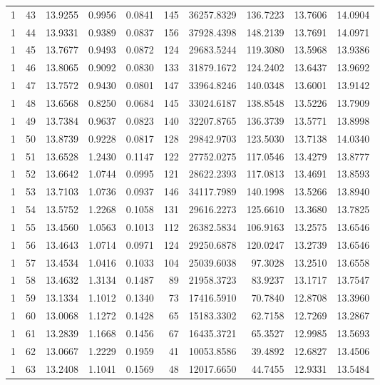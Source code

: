 \begin{longtable}{rrrrrrrrrr}
1 & 43 & 13.9255 & 0.9956 & 0.0841 & 145 & 36257.8329 & 136.7223 & 13.7606 & 14.0904 \\
1 & 44 & 13.9331 & 0.9389 & 0.0837 & 156 & 37928.4398 & 148.2139 & 13.7691 & 14.0971 \\
1 & 45 & 13.7677 & 0.9493 & 0.0872 & 124 & 29683.5244 & 119.3080 & 13.5968 & 13.9386 \\
1 & 46 & 13.8065 & 0.9092 & 0.0830 & 133 & 31879.1672 & 124.2402 & 13.6437 & 13.9692 \\
1 & 47 & 13.7572 & 0.9430 & 0.0801 & 147 & 33964.8246 & 140.0348 & 13.6001 & 13.9142 \\
1 & 48 & 13.6568 & 0.8250 & 0.0684 & 145 & 33024.6187 & 138.8548 & 13.5226 & 13.7909 \\
1 & 49 & 13.7384 & 0.9637 & 0.0823 & 140 & 32207.8765 & 136.3739 & 13.5771 & 13.8998 \\
1 & 50 & 13.8739 & 0.9228 & 0.0817 & 128 & 29842.9703 & 123.5030 & 13.7138 & 14.0340 \\
1 & 51 & 13.6528 & 1.2430 & 0.1147 & 122 & 27752.0275 & 117.0546 & 13.4279 & 13.8777 \\
1 & 52 & 13.6642 & 1.0744 & 0.0995 & 121 & 28622.2393 & 117.0813 & 13.4691 & 13.8593 \\
1 & 53 & 13.7103 & 1.0736 & 0.0937 & 146 & 34117.7989 & 140.1998 & 13.5266 & 13.8940 \\
1 & 54 & 13.5752 & 1.2268 & 0.1058 & 131 & 29616.2273 & 125.6610 & 13.3680 & 13.7825 \\
1 & 55 & 13.4560 & 1.0563 & 0.1013 & 112 & 26382.5834 & 106.9163 & 13.2575 & 13.6546 \\
1 & 56 & 13.4643 & 1.0714 & 0.0971 & 124 & 29250.6878 & 120.0247 & 13.2739 & 13.6546 \\
1 & 57 & 13.4534 & 1.0416 & 0.1033 & 104 & 25039.6038 & 97.3028 & 13.2510 & 13.6558 \\
1 & 58 & 13.4632 & 1.3134 & 0.1487 & 89 & 21958.3723 & 83.9237 & 13.1717 & 13.7547 \\
1 & 59 & 13.1334 & 1.1012 & 0.1340 & 73 & 17416.5910 & 70.7840 & 12.8708 & 13.3960 \\
1 & 60 & 13.0068 & 1.1272 & 0.1428 & 65 & 15183.3302 & 62.7158 & 12.7269 & 13.2867 \\
1 & 61 & 13.2839 & 1.1668 & 0.1456 & 67 & 16435.3721 & 65.3527 & 12.9985 & 13.5693 \\
1 & 62 & 13.0667 & 1.2229 & 0.1959 & 41 & 10053.8586 & 39.4892 & 12.6827 & 13.4506 \\
1 & 63 & 13.2408 & 1.1041 & 0.1569 & 48 & 12017.6650 & 44.7455 & 12.9331 & 13.5484 \\

\end{longtable}
